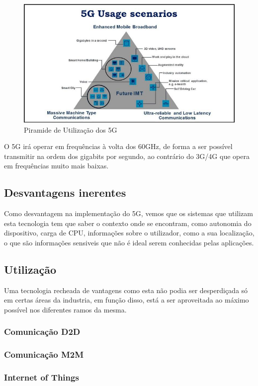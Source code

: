\documentclass{llncs}
\begin{document}
\begin{figure}[h]
  \centering
  \includegraphics[width=12cm]{images/5Gpyramid.jpg}
  \caption{Piramide de Utilização dos 5G}
  \label{fig:pyramid}
\end{figure}

O 5G irá operar em frequências à volta dos 60GHz, de forma
a ser possível transmitir na ordem dos gigabits por segundo,
ao contrário do 3G/4G que opera em frequências muito mais baixas.

\subsection{Desvantagens inerentes}
Como desvantagem na implementação do 5G, vemos que os sistemas que
utilizam esta tecnologia tem que saber o contexto onde se encontram,
como autonomia do dispositivo, carga de CPU, informações sobre o 
utilizador, como a sua localização, o que são informações sensiveis
que não é ideal serem conhecidas pelas aplicações.\cite{Boyd12}

\subsection{Utilização}
Uma tecnologia recheada de vantagens como esta não podia ser desperdiçada
só em certas áreas da industria, em função disso, está a ser aproveitada
ao máximo possível nos diferentes ramos da mesma.
\subsubsection{Comunicação D2D}
\subsubsection{Comunicação M2M}
\subsubsection{Internet of Things}
\end{document}
